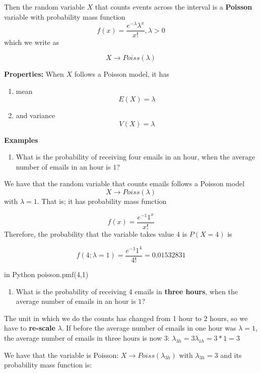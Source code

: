\documentclass[
]{book}
\providecommand{\tightlist}{%
  \setlength{\itemsep}{0pt}\setlength{\parskip}{0pt}}
\begin{document}
Then the random variable \(X\) that counts events across the interval is a \textbf{Poisson} variable with probability mass function\\
\[f(x)= \frac{e^{-\lambda}\lambda^x}{x!}, \lambda>0\]
which we write as

\[X \rightarrow Poiss(\lambda)\]

\textbf{Properties:}
When \(X\) follows a Poisson model, it has

\begin{enumerate}
\def\labelenumi{\arabic{enumi})}
\tightlist
\item
  mean \[E(X)= \lambda\]
\item
  and variance \[V(X)= \lambda\]
\end{enumerate}

\textbf{Examples}

\begin{enumerate}
\def\labelenumi{\arabic{enumi})}
\tightlist
\item
  What is the probability of receiving four emails in an hour, when the average number of emails in an hour is \(1\)?
\end{enumerate}

We have that the random variable that counts emails follows a Poisson model \[X \rightarrow Poiss(\lambda)\] with \(\lambda=1\). That is; it has probability mass function

\[f(x)= \frac{e^{-1}1^x}{x!}\]
Therefore, the probability that the variable takes value 4 is \(P(X=4)\) is

\[f(4; \lambda=1)= \frac{e^{-1}1^4}{4!}=0.01532831\]

in Python poisson.pmf(4,1)

\begin{enumerate}
\def\labelenumi{\arabic{enumi})}
\setcounter{enumi}{1}
\tightlist
\item
  What is the probability of receiving 4 emails in \textbf{three hours}, when the average number of emails in an hour is \(1\)?
\end{enumerate}

The unit in which we do the counts has changed from 1 hour to 2 hours, so we have to \textbf{re-scale} \(\lambda\). If before the average number of emails in one hour was \(\lambda=1\), the average number of emails in three hours is now 3: \(\lambda_{3h}=3\lambda_{1h}=3*1=3\)

We have that the variable is Poisson: \(X \rightarrow Poiss(\lambda_{3h})\) with \(\lambda_{3h}=3\) and its probability mass function is:
\end{document}
